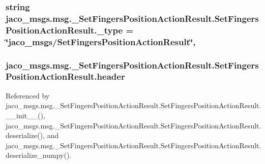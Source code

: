 \subsubsection[{\texorpdfstring{\+\_\+type}{_type}}]{\setlength{\rightskip}{0pt plus 5cm}string jaco\+\_\+msgs.\+msg.\+\_\+\+Set\+Fingers\+Position\+Action\+Result.\+Set\+Fingers\+Position\+Action\+Result.\+\_\+type = \char`\"{}jaco\+\_\+msgs/{\bf Set\+Fingers\+Position\+Action\+Result}\char`\"{}\hspace{0.3cm}{\ttfamily [static]}, {\ttfamily [private]}}\hypertarget{classjaco__msgs_1_1msg_1_1__SetFingersPositionActionResult_1_1SetFingersPositionActionResult_ade312a7a3fa5f01690fe9fb5ad47bae6}{}\label{classjaco__msgs_1_1msg_1_1__SetFingersPositionActionResult_1_1SetFingersPositionActionResult_ade312a7a3fa5f01690fe9fb5ad47bae6}
\subsubsection[{\texorpdfstring{header}{header}}]{\setlength{\rightskip}{0pt plus 5cm}jaco\+\_\+msgs.\+msg.\+\_\+\+Set\+Fingers\+Position\+Action\+Result.\+Set\+Fingers\+Position\+Action\+Result.\+header}\hypertarget{classjaco__msgs_1_1msg_1_1__SetFingersPositionActionResult_1_1SetFingersPositionActionResult_a578636082863e06998608eb35d75247e}{}\label{classjaco__msgs_1_1msg_1_1__SetFingersPositionActionResult_1_1SetFingersPositionActionResult_a578636082863e06998608eb35d75247e}


Referenced by jaco\+\_\+msgs.\+msg.\+\_\+\+Set\+Fingers\+Position\+Action\+Result.\+Set\+Fingers\+Position\+Action\+Result.\+\_\+\+\_\+init\+\_\+\+\_\+(), jaco\+\_\+msgs.\+msg.\+\_\+\+Set\+Fingers\+Position\+Action\+Result.\+Set\+Fingers\+Position\+Action\+Result.\+deserialize(), and jaco\+\_\+msgs.\+msg.\+\_\+\+Set\+Fingers\+Position\+Action\+Result.\+Set\+Fingers\+Position\+Action\+Result.\+deserialize\+\_\+numpy().

